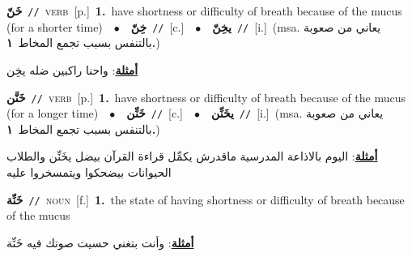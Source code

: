 \documentclass[10pt,a4paper,twoside]{article} %
\begin{document}
\begin{multicols}{2}
{\setlength\topsep{0pt}\textbf{\foreignlanguage{arabic}{خَنّ}}\ {\color{gray}\texttt{//}\color{black}}\ \textsc{verb}\ [p.]\ \textbf{1.}~have shortness or difficulty of breath because of the mucus (for a shorter time)\ \ $\bullet$\ \ \setlength\topsep{0pt}\textbf{\foreignlanguage{arabic}{خِنّ}}\ {\color{gray}\texttt{//}\color{black}}\ [c.]\ \ $\bullet$\ \ \setlength\topsep{0pt}\textbf{\foreignlanguage{arabic}{يخِنّ}}\ {\color{gray}\texttt{//}\color{black}}\ [i.]\ \color{gray}(msa. \foreignlanguage{arabic}{يعاني من صعوبة بالتنفس بسبب تجمع المخاط}~\foreignlanguage{arabic}{\textbf{١.}})\color{black}\  \begin{flushright}\color{gray}\foreignlanguage{arabic}{\textbf{\underline{\foreignlanguage{arabic}{أمثلة}}}: واحنا راكبين ضله يخِن}\end{flushright}\color{black}} \vspace{2mm}

{\setlength\topsep{0pt}\textbf{\foreignlanguage{arabic}{خَنَّن}}\ {\color{gray}\texttt{//}\color{black}}\ \textsc{verb}\ [p.]\ \textbf{1.}~have shortness or difficulty of breath because of the mucus (for a longer time)\ \ $\bullet$\ \ \setlength\topsep{0pt}\textbf{\foreignlanguage{arabic}{خَنِّن}}\ {\color{gray}\texttt{//}\color{black}}\ [c.]\ \ $\bullet$\ \ \setlength\topsep{0pt}\textbf{\foreignlanguage{arabic}{يخَنِّن}}\ {\color{gray}\texttt{//}\color{black}}\ [i.]\ \color{gray}(msa. \foreignlanguage{arabic}{يعاني من صعوبة بالتنفس بسبب تجمع المخاط}~\foreignlanguage{arabic}{\textbf{١.}})\color{black}\  \begin{flushright}\color{gray}\foreignlanguage{arabic}{\textbf{\underline{\foreignlanguage{arabic}{أمثلة}}}: اليوم بالاذاعة المدرسية ماقدرش يكمِّل قراءة القرآن بيضل يخَنِّن والطلاب الحيوانات بيضحكوا ويتمسخروا عليه}\end{flushright}\color{black}} \vspace{2mm}

{\setlength\topsep{0pt}\textbf{\foreignlanguage{arabic}{خَنِّة}}\ {\color{gray}\texttt{//}\color{black}}\ \textsc{noun}\ [f.]\ \textbf{1.}~the state of having shortness or difficulty of breath because of the mucus\  \begin{flushright}\color{gray}\foreignlanguage{arabic}{\textbf{\underline{\foreignlanguage{arabic}{أمثلة}}}: وأنت بتغني حسيت صوتك فيه خَنِّة}\end{flushright}\color{black}} \vspace{2mm}


\end{multicols}
\end{document}
